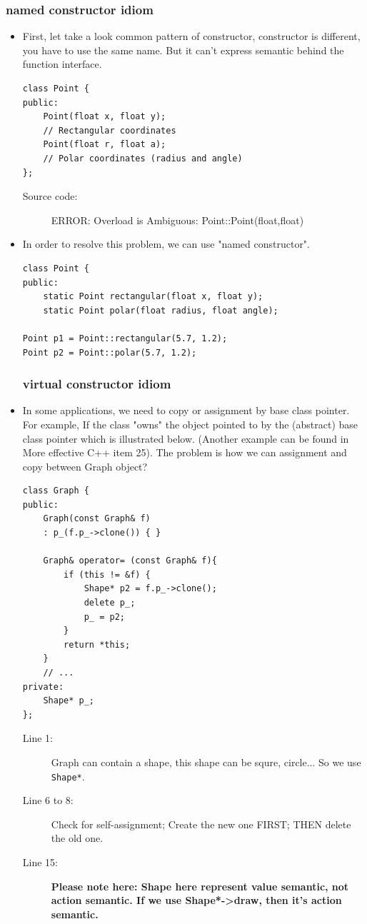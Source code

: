 \documentclass[a4paper,11pt,twoside]{book}
\begin{document}
\subsubsection{named constructor idiom}
\begin{itemize}
	\item First, let take a look common pattern of constructor, constructor is different, you have to use the same name. But it can't express semantic behind the function interface.
\begin{lstlisting}
class Point {
public:
	Point(float x, float y);     
	// Rectangular coordinates
	Point(float r, float a);     
	// Polar coordinates (radius and angle)
};
\end{lstlisting}
\begin{description}
	\item[Source code:] ERROR: Overload is Ambiguous: Point::Point(float,float)
\end{description}

\item In order to resolve this problem, we can use "named constructor". 
\begin{lstlisting}
class Point {
public:
	static Point rectangular(float x, float y);
	static Point polar(float radius, float angle);
	
Point p1 = Point::rectangular(5.7, 1.2);
Point p2 = Point::polar(5.7, 1.2);
\end{lstlisting}

\subsubsection{virtual constructor idiom}
	
	\item In some applications, we need to copy or assignment by base class pointer. For example, If the class "owns" the object pointed to by the (abstract) base class pointer which is illustrated below. (Another example can be found in More effective C++ item 25). The problem is how we can assignment and copy between Graph object? 
	
\begin{lstlisting}
class Graph {
public:
	Graph(const Graph& f)
	: p_(f.p_->clone()) { }
	
	Graph& operator= (const Graph& f){
		if (this != &f) {              
			Shape* p2 = f.p_->clone();   
			delete p_;                   
			p_ = p2;
		}
		return *this;
	}
	// ...
private:
	Shape* p_; 
};
\end{lstlisting}
\begin{description}
	\item[Line 1:] Graph can contain a shape, this shape can be squre, circle... So we use \texttt{Shape*}. 
	\item[Line 6 to 8:] Check for self-assignment; Create the new one FIRST; THEN delete the old one.
	\item[Line 15:]  \textbf{Please note here: Shape here represent value semantic, not action semantic. If we use Shape*->draw, then it's action semantic.}
\end{description}


\end{itemize}
\end{document}
